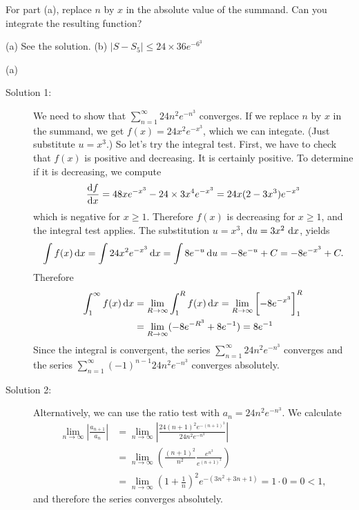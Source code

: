 \begin{hint}
For part (a), replace $n$ by $x$ in the absolute value of the summand.
Can you integrate the resulting function?
\end{hint}

\begin{answer}
(a) See the solution.
\qquad (b)
$|S - S_5 | \le  24 \times 36 e^{-6^3}$

\end{answer}

\begin{solution} (a)
\begin{description}
\item[Solution 1:]
We need to show that
$\sum\limits_{n=1}^\infty 24n^2 e^{-n^3}$ converges.
If we replace $n$ by $x$ in the summand, we get $f(x) = 24x^2 e^{-x^3}$,
which we can integate. (Just substitute $u=x^3$.)
So let's try the integral test.
First, we have to check that $f(x)$ is positive and decreasing.
It is certainly positive. To determine if it is decreasing, we compute
\begin{align*}
\diff{f}{x} = 48x e^{-x^3} - 24\times 3 x^4 e^{-x^3}
= 24x (2-3x^3) e^{-x^3}
\end{align*}
which is negative for $x\ge1$. Therefore $f(x)$ is decreasing for $x\ge1$,
and the integral test applies. The substitution $u=x^3$,
$\mathrm{d}u=3x^2\,\,\mathrm{d}x$, yields
\begin{align*}
\int f(x) \,\mathrm{d}x
= \int 24x^2 e^{-x^3} \,\mathrm{d}x = \int 8 e^{-u}\,\mathrm{d}u = -8e^{-u} + C = -8e^{-x^3} + C.
\end{align*}
Therefore
\begin{align*}
\int_1^\infty f(x) \,\mathrm{d}x &= \lim_{R \to \infty} \int_1^R f(x) \,\mathrm{d}x
  = \lim_{R \to \infty} \bigg[ {-}8 e^{-x^3} \bigg]_1^R  \\
   &= \lim_{R \to \infty} ( - 8 e^{-R^3} + 8 e^{-1}  ) = 8 e^{-1}
\end{align*}
Since the integral is convergent, the series
$\sum\limits_{n=1}^\infty 24n^2 e^{-n^3}$ converges
and the series $\displaystyle \sum_{n=1}^\infty (-1)^{n-1}24n^2 e^{-n^3}$
converges absolutely.

\item[Solution 2:]
Alternatively, we can use the ratio test with $a_n=24n^2 e^{-n^3}$.
We calculate
\begin{align*}
\lim_{n\to\infty} \left|\frac{a_{n+1}}{a_n}\right|
&= \lim_{n\to\infty} \left|\frac{24 (n+1)^2e^{-(n+1)^3}}{24 n^2e^{-n^3}} \right| \\
&= \lim_{n\to\infty} \left( \frac{(n+1)^2}{n^2} \frac{e^{n^3}}{e^{(n+1)^3}} \right) \\
&= \lim_{n\to\infty} \left(1+\frac{1}{n}\right)^2 e^{-(3n^2+3n+1)} = 1\cdot0=0 < 1,
\end{align*}
and therefore the series converges absolutely.


\end{description}
\end{solution}
